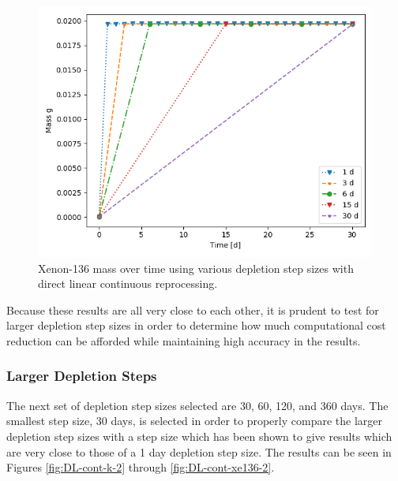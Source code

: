 \begin{figure}[H]
  \centering
  \includegraphics[scale=0.7]{images/DL_NSTEP_Xe-136_mass.png}
  \caption{Xenon-136 mass over time using various depletion step sizes with direct linear continuous reprocessing.}
   \label{fig:DL-cont-xe136}
\end{figure}

Because these results are all very close to each other, it is prudent to test for larger depletion step sizes in order to determine how much computational cost reduction can be afforded while maintaining high accuracy in the results.

\subsubsection{Larger Depletion Steps}

The next set of depletion step sizes selected are 30, 60, 120, and 360 days. The smallest step size, 30 days, is selected in order to properly compare the larger depletion step sizes with a step size which has been shown to give results which are very close to those of a 1 day depletion step size. The results can be seen in Figures \ref{fig:DL-cont-k-2} through \ref{fig:DL-cont-xe136-2}. 

